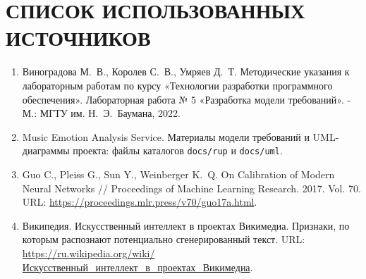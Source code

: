 \section*{СПИСОК ИСПОЛЬЗОВАННЫХ ИСТОЧНИКОВ}
\begin{enumerate}
 \item Виноградова М.~В., Королев С.~В., Умряев Д.~Т. Методические указания
 к лабораторным работам по курсу «Технологии разработки программного обеспечения».
 Лабораторная работа № 5 «Разработка модели требований». - М.: МГТУ
 им. Н.~Э.~Баумана, 2022.
 \item Music Emotion Analysis Service. Материалы модели требований и UML-диаграммы
 проекта: файлы каталогов \texttt{docs/rup} и \texttt{docs/uml}.
 \item Guo C., Pleiss G., Sun Y., Weinberger K.~Q. On Calibration of Modern
 Neural Networks // Proceedings of Machine Learning Research. 2017. Vol. 70.
 URL: \url{https://proceedings.mlr.press/v70/guo17a.html}.
 \item Википедия. Искусственный интеллект в проектах Викимедиа.
 Признаки, по которым распознают потенциально сгенерированный текст.
 URL: \url{https://ru.wikipedia.org/wiki/Искусственный_интеллект_в_проектах_Викимедиа}.
\end{enumerate}
